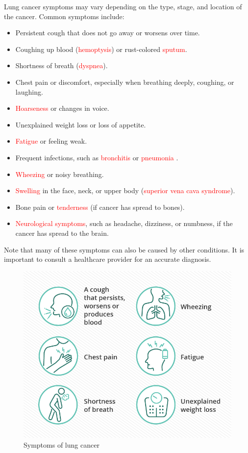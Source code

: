 Lung cancer symptoms may vary depending on the type, stage, and location of the cancer. Common symptoms include:

\begin{highlight}
\begin{itemize}
    \item Persistent cough that does not go away or worsens over time.
    \item Coughing up blood (\textcolor{red}{hemoptysis}) or rust-colored \textcolor{red}{sputum}.
    \item Shortness of breath (\textcolor{red}{dyspnea}).
    \item Chest pain or discomfort, especially when breathing deeply, coughing, or laughing.
    \item \textcolor{red}{Hoarseness} or changes in voice.
    \item Unexplained weight loss or loss of appetite.
    \item \textcolor{red}{Fatigue} or feeling weak.
    \item Frequent infections, such as \textcolor{red}{bronchitis} or \textcolor{red}{pneumonia} .
    \item \textcolor{red}{Wheezing} or noisy breathing.
    \item \textcolor{red}{Swelling} in the face, neck, or upper body (\textcolor{red}{superior vena cava syndrome}).
    \item Bone pain or \textcolor{red}{tenderness} (if cancer has spread to bones).
    \item \textcolor{red}{Neurological symptoms}, such as headache, dizziness, or numbness, if the cancer has spread to the brain.
\end{itemize}
\end{highlight}
\begin{remark}
Note that many of these symptoms can also be caused by other conditions. It is important to consult a healthcare provider for an accurate diagnosis.
\end{remark}
\begin{figure}[h!]
    \centering
    \includegraphics[width= 0.675\linewidth]{images/Lung-Cancer-Symptoms-DT.png}
    \caption{Symptoms of lung cancer}
    \label{fig:symptoms}
\end{figure}

\newpage
